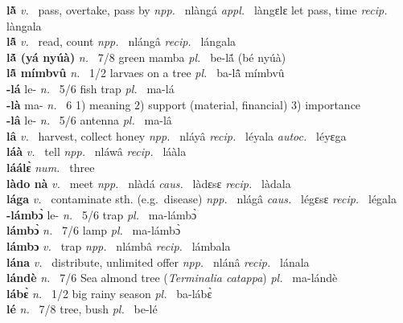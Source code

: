 \noindent
{\bfseries lã̀}  {\itshape v.~} pass, overtake, pass by   {\itshape npp.~} nlàngá {\itshape appl.~} làngɛlɛ let pass, time {\itshape recip.~} làngala \\ 
{\bfseries lã̂}  {\itshape v.~} read, count   {\itshape npp.~} nlángâ {\itshape recip.~} lángala \\ 
{\bfseries lã́ (yá nyúà)}  {\itshape n.~} 7/8 green mamba {\itshape pl.~} be-lã́ (bé nyúà)    \\ 
{\bfseries lã̂ mímbvû}  {\itshape n.~} 1/2 larvaes on a tree {\itshape pl.~} ba-lã̂ mímbvû    \\ 
{\bfseries -lá} le- {\itshape n.~} 5/6 fish trap {\itshape pl.~} ma-lá    \\ 
{\bfseries -là} ma- {\itshape n.~} 6 1) meaning 2) support (material, financial) 3) importance    \\ 
{\bfseries -lâ} le- {\itshape n.~} 5/6 antenna {\itshape pl.~} ma-lâ    \\ 
{\bfseries lâ}  {\itshape v.~} harvest, collect honey   {\itshape npp.~} nláyâ {\itshape recip.~} léyala {\itshape autoc.~} léyɛga  \\ 
{\bfseries láà}  {\itshape v.~} tell    {\itshape npp.~} nláwâ {\itshape recip.~} láàla  \\ 
{\bfseries láálɛ̀}  {\itshape num.~} three    \\ 
{\bfseries làdo nà}  {\itshape v.~} meet   {\itshape npp.~} nlàdá {\itshape caus.~} làdɛsɛ {\itshape recip.~} làdala  \\ 
{\bfseries lága}  {\itshape v.~} contaminate sth. (e.g.\ disease)   {\itshape npp.~} nlágâ {\itshape caus.~} légɛsɛ {\itshape recip.~} légala  \\ 
{\bfseries -lámbɔ̀} le- {\itshape n.~} 5/6 trap {\itshape pl.~} ma-lámbɔ̀    \\ 
{\bfseries lámbɔ̀}  {\itshape n.~} 7/6 lamp {\itshape pl.~} ma-lámbɔ̀    \\ 
{\bfseries lámbɔ}  {\itshape v.~} trap   {\itshape npp.~} nlámbâ {\itshape recip.~} lámbala  \\ 
{\bfseries lána}  {\itshape v.~} distribute, unlimited offer   {\itshape npp.~} nlánâ {\itshape recip.~} lánala  \\ 
{\bfseries lándè}  {\itshape n.~} 7/6 Sea almond tree ({\itshape Terminalia catappa}) {\itshape pl.~} ma-lándè    \\ 
{\bfseries lábɛ̀}   {\itshape n.~} 1/2 big rainy season {\itshape pl.~} ba-lábɛ̀    \\ 
{\bfseries lé}  {\itshape n.~} 7/8 tree, bush {\itshape pl.~} be-lé    \\ 

